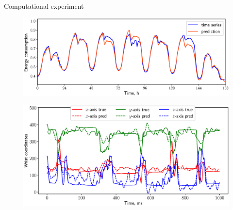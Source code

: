 \documentclass{beamer}
\begin{document}
\begin{frame}{Computational experiment}
	\begin{figure}
		\includegraphics[width=0.8\linewidth]{figs/energy_prediction_pres.eps}
	\end{figure}
	\vspace{-0.5cm}
	\begin{figure}
		\includegraphics[width=0.8\linewidth]{figs/ecog_prediction_pres.eps}
	\end{figure}
\end{frame}
\end{document}
